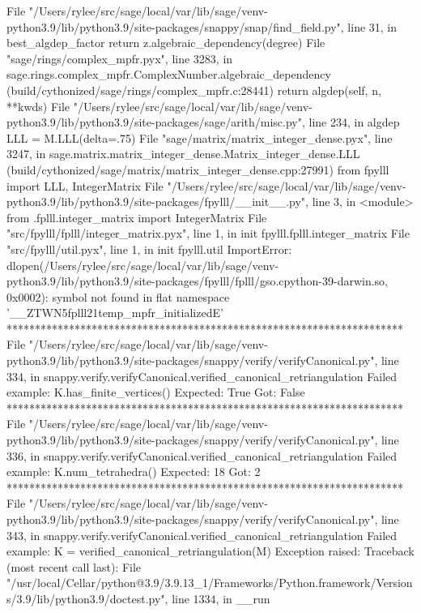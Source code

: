       File "/Users/rylee/src/sage/local/var/lib/sage/venv-python3.9/lib/python3.9/site-packages/snappy/snap/find_field.py", line 31, in best_algdep_factor
        return z.algebraic_dependency(degree)
      File "sage/rings/complex_mpfr.pyx", line 3283, in sage.rings.complex_mpfr.ComplexNumber.algebraic_dependency (build/cythonized/sage/rings/complex_mpfr.c:28441)
        return algdep(self, n, **kwds)
      File "/Users/rylee/src/sage/local/var/lib/sage/venv-python3.9/lib/python3.9/site-packages/sage/arith/misc.py", line 234, in algdep
        LLL = M.LLL(delta=.75)
      File "sage/matrix/matrix_integer_dense.pyx", line 3247, in sage.matrix.matrix_integer_dense.Matrix_integer_dense.LLL (build/cythonized/sage/matrix/matrix_integer_dense.cpp:27991)
        from fpylll import LLL, IntegerMatrix
      File "/Users/rylee/src/sage/local/var/lib/sage/venv-python3.9/lib/python3.9/site-packages/fpylll/__init__.py", line 3, in <module>
        from .fplll.integer_matrix import IntegerMatrix
      File "src/fpylll/fplll/integer_matrix.pyx", line 1, in init fpylll.fplll.integer_matrix
      File "src/fpylll/util.pyx", line 1, in init fpylll.util
    ImportError: dlopen(/Users/rylee/src/sage/local/var/lib/sage/venv-python3.9/lib/python3.9/site-packages/fpylll/fplll/gso.cpython-39-darwin.so, 0x0002): symbol not found in flat namespace '__ZTWN5fplll21temp_mpfr_initializedE'
**********************************************************************
File "/Users/rylee/src/sage/local/var/lib/sage/venv-python3.9/lib/python3.9/site-packages/snappy/verify/verifyCanonical.py", line 334, in snappy.verify.verifyCanonical.verified_canonical_retriangulation
Failed example:
    K.has_finite_vertices()
Expected:
    True
Got:
    False
**********************************************************************
File "/Users/rylee/src/sage/local/var/lib/sage/venv-python3.9/lib/python3.9/site-packages/snappy/verify/verifyCanonical.py", line 336, in snappy.verify.verifyCanonical.verified_canonical_retriangulation
Failed example:
    K.num_tetrahedra()
Expected:
    18
Got:
    2
**********************************************************************
File "/Users/rylee/src/sage/local/var/lib/sage/venv-python3.9/lib/python3.9/site-packages/snappy/verify/verifyCanonical.py", line 343, in snappy.verify.verifyCanonical.verified_canonical_retriangulation
Failed example:
    K = verified_canonical_retriangulation(M)
Exception raised:
    Traceback (most recent call last):
      File "/usr/local/Cellar/python@3.9/3.9.13_1/Frameworks/Python.framework/Versions/3.9/lib/python3.9/doctest.py", line 1334, in __run
